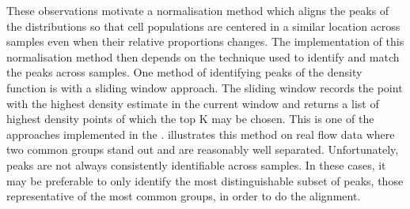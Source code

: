 These observations motivate a normalisation method which aligns the peaks of the distributions so that cell populations are centered
in a similar location across samples even when their relative proportions changes.
The implementation of this normalisation method then depends on the technique used to identify and match the peaks across samples.
One method of identifying peaks of the density function is with a sliding window approach.
The sliding window records the point with the highest density estimate in the current window and
returns a list of highest density points of which the top K may be chosen.
This is one of the approaches implemented in the .
 illustrates this method on real flow data where two common groups stand out and are reasonably well separated.
Unfortunately, peaks are not always consistently identifiable across samples.
In these cases, it may be preferable to only identify the most distinguishable subset of peaks, those representative of the most common groups,
in order to do the alignment.
